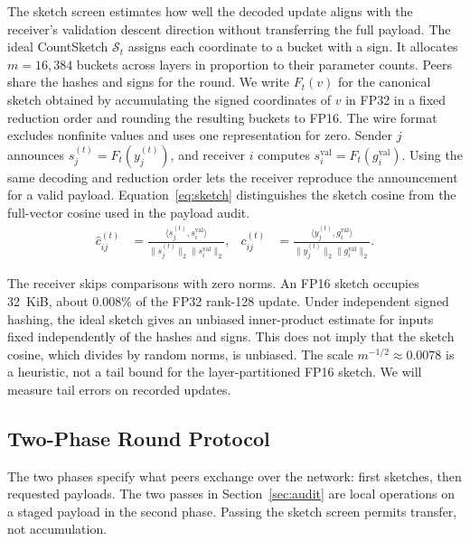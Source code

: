 \documentclass{article}
\begin{document}
The sketch screen estimates how well the decoded update aligns with the receiver's validation descent direction without transferring the full payload. The ideal CountSketch $\mathcal S_t$ assigns each coordinate to a bucket with a sign. It allocates $m=16{,}384$ buckets across layers in proportion to their parameter counts. Peers share the hashes and signs for the round. We write $F_t(v)$ for the canonical sketch obtained by accumulating the signed coordinates of $v$ in FP32 in a fixed reduction order and rounding the resulting buckets to FP16. The wire format excludes nonfinite values and uses one representation for zero. Sender $j$ announces $s_j^{(t)}=F_t(y_j^{(t)})$, and receiver $i$ computes $s_i^{\mathrm{val}}=F_t(g_i^{\mathrm{val}})$. Using the same decoding and reduction order lets the receiver reproduce the announcement for a valid payload. Equation~\eqref{eq:sketch} distinguishes the sketch cosine from the full-vector cosine used in the payload audit.
\begin{equation}
\begin{aligned}
  \widehat c_{ij}^{(t)} &=\frac{\langle s_j^{(t)},s_i^{\mathrm{val}}\rangle}
  {\|s_j^{(t)}\|_2\|s_i^{\mathrm{val}}\|_2}, &
  c_{ij}^{(t)} &=\frac{\langle y_j^{(t)},g_i^{\mathrm{val}}\rangle}
  {\|y_j^{(t)}\|_2\|g_i^{\mathrm{val}}\|_2} .
\end{aligned}
\label{eq:sketch}
\end{equation}

The receiver skips comparisons with zero norms. An FP16 sketch occupies 32~KiB, about $0.008\%$ of the FP32 rank-128 update. Under independent signed hashing, the ideal sketch gives an unbiased inner-product estimate for inputs fixed independently of the hashes and signs. This does not imply that the sketch cosine, which divides by random norms, is unbiased. The scale $m^{-1/2}\approx 0.0078$ is a heuristic, not a tail bound for the layer-partitioned FP16 sketch. We will measure tail errors on recorded updates.

\subsection{Two-Phase Round Protocol}

The two phases specify what peers exchange over the network: first sketches, then requested payloads. The two passes in Section~\ref{sec:audit} are local operations on a staged payload in the second phase. Passing the sketch screen permits transfer, not accumulation.
\end{document}
